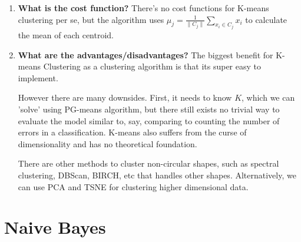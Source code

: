 \documentclass{article}
\begin{document}
\begin{enumerate}
    \item \textbf{What is the cost function?}
    \noindent 
    \smallbreak
    There's no cost functions for K-means clustering per se, but the algorithm uses $\mu_j = \frac{1}{\|C_j\|} \sum_{x_i \in C_j} x_i$ to calculate the mean of each centroid.
    
    \item \textbf{What are the advantages/disadvantages?}
    \noindent 
    \smallbreak
    The biggest benefit for K-means Clustering as a clustering algorithm is that its super easy to implement.
    
    However there are many downsides. First, it needs to know $K$, which we can 'solve' using PG-means algorithm\cite{5}, but there still exists no trivial way to evaluate the model similar to, say, comparing to counting the number of errors in a classification. K-means also suffers from the curse of dimensionality and has no theoretical foundation.
    
    There are other methods to cluster non-circular shapes, such as spectral clustering, DBScan, BIRCH, etc that handles other shapes. Alternatively, we can use PCA and TSNE for clustering higher dimensional data.
\end{enumerate}



\section{Naive Bayes}
\end{document}

